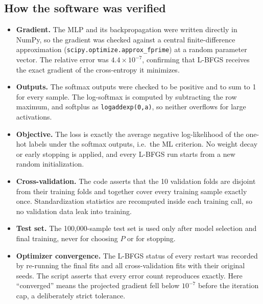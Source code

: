 \documentclass[11pt]{article}
\begin{document}
\subsection*{How the software was verified}
\begin{itemize}
\item \textbf{Gradient.} The MLP and its backpropagation were written directly in NumPy, so the gradient was checked against a central finite-difference approximation (\texttt{scipy.optimize.approx\_fprime}) at a random parameter vector. The relative error was $4.4\times10^{-7}$, confirming that L-BFGS receives the exact gradient of the cross-entropy it minimizes.
\item \textbf{Outputs.} The softmax outputs were checked to be positive and to sum to 1 for every sample. The log-softmax is computed by subtracting the row maximum, and softplus as \texttt{logaddexp(0,a)}, so neither overflows for large activations.
\item \textbf{Objective.} The loss is exactly the average negative log-likelihood of the one-hot labels under the softmax outputs, i.e.\ the ML criterion. No weight decay or early stopping is applied, and every L-BFGS run starts from a new random initialization.
\item \textbf{Cross-validation.} The code asserts that the 10 validation folds are disjoint from their training folds and together cover every training sample exactly once. Standardization statistics are recomputed inside each training call, so no validation data leak into training.
\item \textbf{Test set.} The 100{,}000-sample test set is used only after model selection and final training, never for choosing $P$ or for stopping.
\item \textbf{Optimizer convergence.} The L-BFGS status of every restart was recorded by re-running the final fits and all cross-validation fits with their original seeds. The script asserts that every error count reproduces exactly. Here ``converged'' means the projected gradient fell below $10^{-7}$ before the iteration cap, a deliberately strict tolerance.
\begin{center}
\end{center}
\end{itemize}
\end{document}
